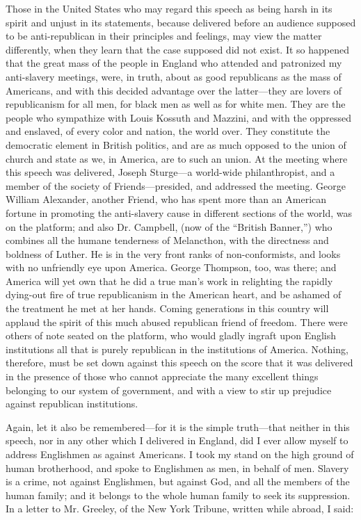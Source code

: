Those in the United States who may regard this speech as being harsh in
its spirit and unjust in its statements, because delivered before an
audience supposed to be anti-republican in their principles and
feelings, may view the matter differently, when they learn that the case
supposed did not exist. It so happened that the great mass of the people
in England who attended and patronized my anti-slavery meetings, were,
in truth, about as good republicans as the mass of Americans, and with
this decided advantage over the latter---they are lovers of
republicanism for all men, for black men as well as for white men. They
are the people who sympathize with Louis Kossuth and Mazzini, and with
the oppressed and enslaved, of every color and nation, the world over.
They constitute the democratic element in British politics, and are as
much opposed to the {\protect\hypertarget{378}{}{}}union of church and
state as we, in America, are to such an union. At the meeting where this
speech was delivered, Joseph Sturge---a world-wide philanthropist, and a
member of the society of Friends---presided, and addressed the meeting.
George William Alexander, another Friend, who has spent more than an
American fortune in promoting the anti-slavery cause in different
sections of the world, was on the platform; and also Dr. Campbell, (now
of the ``British Banner,'') who combines all the humane tenderness of
Melancthon, with the directness and boldness of Luther. He is in the
very front ranks of non-conformists, and looks with no unfriendly eye
upon America. George Thompson, too, was there; and America will yet own
that he did a true man's work in relighting the rapidly dying-out fire
of true republicanism in the American heart, and be ashamed of the
treatment he met at her hands. Coming generations in this country will
applaud the spirit of this much abused republican friend of freedom.
There were others of note seated on the platform, who would gladly
ingraft upon English institutions all that is purely republican in the
institutions of America. Nothing, therefore, must be set down against
this speech on the score that it was delivered in the presence of those
who cannot appreciate the many excellent things belonging to our system
of government, and with a view to stir up prejudice against republican
institutions.

Again, let it also be remembered---for it is the simple truth---that
neither in this speech, nor in any other which I delivered in England,
did I ever allow {\protect\hypertarget{379}{}{}}myself to address
Englishmen as against Americans. I took my stand on the high ground of
human brotherhood, and spoke to Englishmen as men, in behalf of men.
Slavery is a crime, not against Englishmen, but against God, and all the
members of the human family; and it belongs to the whole human family to
seek its suppression. In a letter to Mr. Greeley, of the New York
Tribune, written while abroad, I said:

